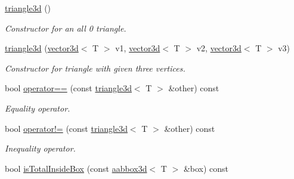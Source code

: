 \begin{DoxyCompactItemize}
\item 
\mbox{\label{classirr_1_1core_1_1triangle3d_a4626559294771a8a2fb0cbbaedb6c5f9}} 
\hyperlink{classirr_1_1core_1_1triangle3d_a4626559294771a8a2fb0cbbaedb6c5f9}{triangle3d} ()
\begin{DoxyCompactList}\small\item\em Constructor for an all 0 triangle. \end{DoxyCompactList}\item 
\mbox{\label{classirr_1_1core_1_1triangle3d_a489813c59bd130d256640ba4e2745505}} 
\hyperlink{classirr_1_1core_1_1triangle3d_a489813c59bd130d256640ba4e2745505}{triangle3d} (\hyperlink{classirr_1_1core_1_1vector3d}{vector3d}$<$ T $>$ v1, \hyperlink{classirr_1_1core_1_1vector3d}{vector3d}$<$ T $>$ v2, \hyperlink{classirr_1_1core_1_1vector3d}{vector3d}$<$ T $>$ v3)
\begin{DoxyCompactList}\small\item\em Constructor for triangle with given three vertices. \end{DoxyCompactList}\item 
\mbox{\label{classirr_1_1core_1_1triangle3d_abb94d1199eedc6ab2d2306ca4f5ea86e}} 
bool \hyperlink{classirr_1_1core_1_1triangle3d_abb94d1199eedc6ab2d2306ca4f5ea86e}{operator==} (const \hyperlink{classirr_1_1core_1_1triangle3d}{triangle3d}$<$ T $>$ \&other) const
\begin{DoxyCompactList}\small\item\em Equality operator. \end{DoxyCompactList}\item 
\mbox{\label{classirr_1_1core_1_1triangle3d_a914fd8e860dcb44d9a5d264d0a8b25ec}} 
bool \hyperlink{classirr_1_1core_1_1triangle3d_a914fd8e860dcb44d9a5d264d0a8b25ec}{operator!=} (const \hyperlink{classirr_1_1core_1_1triangle3d}{triangle3d}$<$ T $>$ \&other) const
\begin{DoxyCompactList}\small\item\em Inequality operator. \end{DoxyCompactList}\item 
bool \hyperlink{classirr_1_1core_1_1triangle3d_a9baf7f6b0d49b8046f434cf0829eb8fd}{is\+Total\+Inside\+Box} (const \hyperlink{classirr_1_1core_1_1aabbox3d}{aabbox3d}$<$ T $>$ \&box) const

\end{DoxyCompactItemize}
